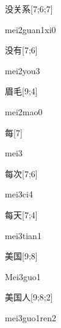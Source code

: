 \begin{verbete}{没关系}[7;6;7]
\begin{pronuncia}{mei2guan1xi0}
\end{pronuncia}
\end{verbete}

\begin{verbete}{没有}[7;6]
\begin{pronuncia}{mei2you3}
\end{pronuncia}
\end{verbete}

\begin{verbete}{眉毛}[9;4]
\begin{pronuncia}{mei2mao0}
\end{pronuncia}
\end{verbete}

\begin{verbete}[mei3]{每}[7]
\begin{pronuncia}{mei3}
\end{pronuncia}
\end{verbete}

\begin{verbete}[mei3ci4]{每次}[7;6]
\begin{pronuncia}{mei3ci4}
\end{pronuncia}
\end{verbete}

\begin{verbete}{每天}[7;4]
\begin{pronuncia}{mei3tian1}
\end{pronuncia}
\end{verbete}

\begin{verbete}{美国}[9;8]
\begin{pronuncia}{Mei3guo1}
\end{pronuncia}
\end{verbete}

\begin{verbete}{美国人}[9;8;2]
\begin{pronuncia}{mei3guo1ren2}
\end{pronuncia}
\end{verbete}

